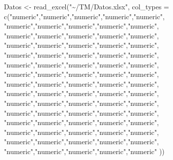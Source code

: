 \documentclass[
  us-letterpaper,
]{scrreprt}
\newenvironment{Shaded}{\begin{snugshade}}{\end{snugshade}}
\newcommand{\AttributeTok}[1]{\textcolor[rgb]{0.40,0.45,0.13}{#1}}
\newcommand{\FunctionTok}[1]{\textcolor[rgb]{0.28,0.35,0.67}{#1}}
\newcommand{\NormalTok}[1]{\textcolor[rgb]{0.00,0.23,0.31}{#1}}
\newcommand{\OtherTok}[1]{\textcolor[rgb]{0.00,0.23,0.31}{#1}}
\newcommand{\StringTok}[1]{\textcolor[rgb]{0.13,0.47,0.30}{#1}}
\theoremstyle{plain}
\theoremstyle{plain}
\theoremstyle{definition}
\theoremstyle{remark}
\begin{document}
\begin{Shaded}
\begin{Highlighting}[]
\NormalTok{Datos }\OtherTok{\textless{}{-}} \FunctionTok{read\_excel}\NormalTok{(}\StringTok{"\textasciitilde{}/TM/Datos.xlsx"}\NormalTok{, }\AttributeTok{col\_types =} 
                  \FunctionTok{c}\NormalTok{(}\StringTok{"numeric"}\NormalTok{,}\StringTok{"numeric"}\NormalTok{,}\StringTok{"numeric"}\NormalTok{,}\StringTok{"numeric"}\NormalTok{,}\StringTok{"numeric"}\NormalTok{,}
                    \StringTok{"numeric"}\NormalTok{,}\StringTok{"numeric"}\NormalTok{,}\StringTok{"numeric"}\NormalTok{,}\StringTok{"numeric"}\NormalTok{,}\StringTok{"numeric"}\NormalTok{, }
                    \StringTok{"numeric"}\NormalTok{,}\StringTok{"numeric"}\NormalTok{,}\StringTok{"numeric"}\NormalTok{,}\StringTok{"numeric"}\NormalTok{,}\StringTok{"numeric"}\NormalTok{, }
                    \StringTok{"numeric"}\NormalTok{,}\StringTok{"numeric"}\NormalTok{,}\StringTok{"numeric"}\NormalTok{,}\StringTok{"numeric"}\NormalTok{,}\StringTok{"numeric"}\NormalTok{, }
                    \StringTok{"numeric"}\NormalTok{,}\StringTok{"numeric"}\NormalTok{,}\StringTok{"numeric"}\NormalTok{,}\StringTok{"numeric"}\NormalTok{,}\StringTok{"numeric"}\NormalTok{, }
                    \StringTok{"numeric"}\NormalTok{,}\StringTok{"numeric"}\NormalTok{,}\StringTok{"numeric"}\NormalTok{,}\StringTok{"numeric"}\NormalTok{,}\StringTok{"numeric"}\NormalTok{, }
                    \StringTok{"numeric"}\NormalTok{,}\StringTok{"numeric"}\NormalTok{,}\StringTok{"numeric"}\NormalTok{,}\StringTok{"numeric"}\NormalTok{,}\StringTok{"numeric"}\NormalTok{, }
                    \StringTok{"numeric"}\NormalTok{,}\StringTok{"numeric"}\NormalTok{,}\StringTok{"numeric"}\NormalTok{,}\StringTok{"numeric"}\NormalTok{,}\StringTok{"numeric"}\NormalTok{, }
                    \StringTok{"numeric"}\NormalTok{,}\StringTok{"numeric"}\NormalTok{,}\StringTok{"numeric"}\NormalTok{,}\StringTok{"numeric"}\NormalTok{,}\StringTok{"numeric"}\NormalTok{,}
                    \StringTok{"numeric"}\NormalTok{,}\StringTok{"numeric"}\NormalTok{,}\StringTok{"numeric"}\NormalTok{,}\StringTok{"numeric"}\NormalTok{,}\StringTok{"numeric"}\NormalTok{, }
                    \StringTok{"numeric"}\NormalTok{,}\StringTok{"numeric"}\NormalTok{,}\StringTok{"numeric"}\NormalTok{,}\StringTok{"numeric"}\NormalTok{,}\StringTok{"numeric"}\NormalTok{, }
                    \StringTok{"numeric"}\NormalTok{,}\StringTok{"numeric"}\NormalTok{,}\StringTok{"numeric"}\NormalTok{,}\StringTok{"numeric"}\NormalTok{,}\StringTok{"numeric"}\NormalTok{, }
                    \StringTok{"numeric"}\NormalTok{,}\StringTok{"numeric"}\NormalTok{,}\StringTok{"numeric"}\NormalTok{,}\StringTok{"numeric"}\NormalTok{,}\StringTok{"numeric"}\NormalTok{, }
                    \StringTok{"numeric"}\NormalTok{,}\StringTok{"numeric"}\NormalTok{,}\StringTok{"numeric"}\NormalTok{,}\StringTok{"numeric"}\NormalTok{,}\StringTok{"numeric"}\NormalTok{, }
                    \StringTok{"numeric"}\NormalTok{,}\StringTok{"numeric"}\NormalTok{,}\StringTok{"numeric"}\NormalTok{,}\StringTok{"numeric"}\NormalTok{,}\StringTok{"numeric"}
\NormalTok{                        ))}


\end{Highlighting}
\end{Shaded}
\end{document}
